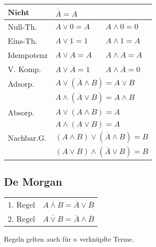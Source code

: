 \begin{flushleft}
    \renewcommand{\arraystretch}{1.5}
    \begin{tabular}{l l l}
        Nicht & $\overline{\overline{A}} = A$ & \\
        \hline
        Null-Th. & $A \lor 0 = A$ & $A \land 0 = 0$\\
        \hline
        Eins-Th. & $A \lor 1 = 1$ & $A \land 1 = A$\\
        \hline
        Idempotenz & $A \lor A = A$ & $A \land A = A$\\
        \hline
        V. Komp. & $A \lor \overline{A} = 1$ & $A \land \overline{A} = 0$\\
        \hline
        Adsorp. & \multicolumn{2}{l}{$A \lor (\overline{A} \land B) = A \lor B$}\\
        & \multicolumn{2}{l}{$A \land (\overline{A} \lor B) = A \land B$}\\
        \hline
        Absorp. & \multicolumn{2}{l}{$A \lor (A \land B) = A$}\\
        & \multicolumn{2}{l}{$A \land (A \lor B) = A$}\\
        \hline
        Nachbar.G. & \multicolumn{2}{l}{$(A \land B) \lor (\overline{A} \land B) = B$}\\
        & \multicolumn{2}{l}{$(A \lor B) \land (\overline{A} \lor B) = B$}
    \end{tabular}
\end{flushleft}

\subsection{De Morgan}
\begin{flushleft}
    \renewcommand{\arraystretch}{1.5}
    \begin{tabular}{l l}
        1. Regel & $\overline{A \land B} = \overline{A} \lor \overline{B}$\\
        2. Regel & $\overline{A \lor B} = \overline{A} \land \overline{B}$\\
    \end{tabular}
\end{flushleft}
Regeln gelten auch für $n$ verknüpfte Terme.

